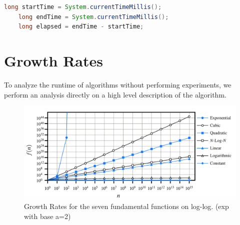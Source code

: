 \documentclass[../Main.tex]{subfiles}
\begin{document}
\begin{lstlisting}[language=Java, caption=Example Measurement]
    long startTime = System.currentTimeMillis();
    long endTime = System.currentTimeMillis();
    long elapsed = endTime - startTime;
\end{lstlisting}

\section{Growth Rates}
To analyze the runtime of algorithms without performing experiments, we perform an analysis directly on
a high level description of the algorithm.


\begin{figure}[H]
    \centering
    \includegraphics[width=1\linewidth]{Images/growthrates.png}
    \caption{Growth Rates for the seven fundamental functions on log-log. (exp with base a=2)}
\end{figure}
\newpage
\end{document}
